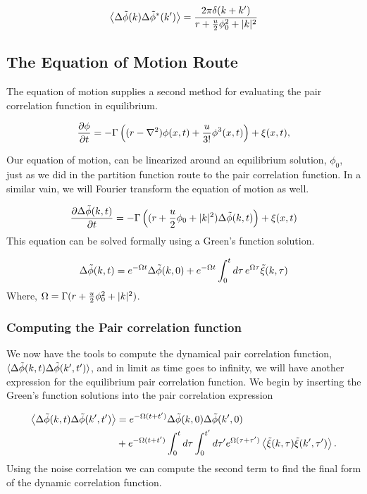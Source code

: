 \begin{equation}
\left\langle \Delta\tilde{\phi}(k)\Delta\tilde{\phi}^{*}(k^\prime) \right\rangle = \frac{2\pi \delta(k+k^\prime)}{r + \frac{u}{2}\phi_0^2 + \vert k \vert^2}
\end{equation}

\subsection{The Equation of Motion Route}

The equation of motion supplies a second method for evaluating the pair correlation function in equilibrium.

\begin{equation}
\frac{\partial \phi}{\partial t} = -\Gamma\left((r-\nabla^2)\phi(x,t) + \frac{u}{3!}\phi^3(x,t)\right) + \xi(x, t),
\end{equation}

Our equation of motion, can be linearized around an equilibrium solution, $\phi_0$, just as we did in the partition function route to the pair correlation function. In a similar vain, we will Fourier transform the equation of motion as well.

\begin{equation}
\frac{\partial \Delta\tilde{\phi}(k, t)}{\partial t} = -\Gamma\left((r + \frac{u}{2}\phi_0 + \vert k \vert^2)\Delta\tilde{\phi}(k,t)\right) + \xi(x,t)
\end{equation}
This equation can be solved formally using a Green's function solution.

\begin{equation}
\Delta\tilde{\phi}(k, t) = e^{-\Omega t}\Delta\tilde{\phi}(k, 0) + e^{-\Omega t}\int_0^t d\tau \,e^{\Omega \tau} \tilde{\xi}(k, \tau)
\end{equation}
Where, $\Omega = \Gamma (r + \frac{u}{2}\phi_0^2 + \vert k \vert^2)$.

\subsubsection{Computing the Pair correlation function}

We now have the tools to compute the dynamical pair correlation function, $\langle \Delta\tilde{\phi}(k, t)\Delta\tilde{\phi}(k^\prime, t^\prime) \rangle $, and in limit as time goes to infinity, we will have another expression for the equilibrium pair correlation function. We begin by inserting the Green's function solutions into the pair correlation expression

\begin{align}
\left\langle \Delta\tilde{\phi}(k, t) \Delta\tilde{\phi}(k^\prime, t^\prime)\right\rangle &=  e^{-\Omega(t+t^\prime)}\Delta\tilde{\phi}(k, 0)\Delta\tilde{\phi}(k^\prime, 0) \nonumber \\
 &+ e^{-\Omega (t+t^\prime)} \int_0^t d\tau \int_0^{t^\prime} d\tau^\prime e^{\Omega(\tau+\tau^\prime)}\left\langle \tilde{\xi}(k, \tau) \tilde{\xi}(k^\prime, \tau^\prime) \right\rangle.
\end{align}
Using the noise correlation we can compute the second term to find the final form of the dynamic correlation function.

